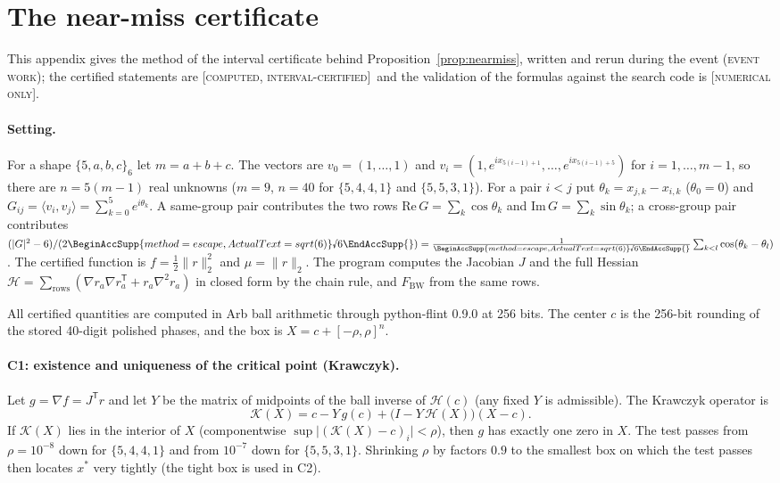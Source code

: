 \documentclass[11pt]{article}
\newcommand{\rnum}[1]{\BeginAccSupp{method=escape,ActualText=sqrt(#1)}\text{\textsurd}#1\EndAccSupp{}}
\newcommand{\rsix}{\rnum{6}}
\newcommand{\ip}[2]{\langle #1,#2\rangle}
\newcommand{\abs}[1]{\lvert #1\rvert}
\newcommand{\norm}[1]{\lVert #1\rVert}
\newcommand{\st}[1]{\textsc{[#1]}}
\newcommand{\stcert}{\st{computed, interval-certified}}
\newcommand{\stnum}{\st{numerical only}}
\newcommand{\event}{\textsc{(event work)}}
\theoremstyle{definition}
\theoremstyle{remark}
\begin{document}
\section{The near-miss certificate}\label{app:nearmiss}

\noindent This appendix gives the method of the interval certificate behind Proposition~\ref{prop:nearmiss}, written and rerun during the event \event; the certified statements are \stcert\ and the validation of the formulas against the search code is \stnum.

\paragraph{Setting.} For a shape $\{5,a,b,c\}_6$ let $m=a+b+c$. The vectors are $v_0=(1,\dots,1)$ and $v_i=(1,e^{ix_{5(i-1)+1}},\dots,e^{ix_{5(i-1)+5}})$ for $i=1,\dots,m-1$, so there are $n=5(m-1)$ real unknowns ($m=9$, $n=40$ for $\{5,4,4,1\}$ and $\{5,5,3,1\}$). For a pair $i<j$ put $\theta_k=x_{j,k}-x_{i,k}$ ($\theta_0=0$) and $G_{ij}=\ip{v_i}{v_j}=\sum_{k=0}^5e^{i\theta_k}$. A same-group pair contributes the two rows $\mathrm{Re}\,G=\sum_k\cos\theta_k$ and $\mathrm{Im}\,G=\sum_k\sin\theta_k$; a cross-group pair contributes $(\abs{G}^2-6)/(2\rsix)=\frac1{\rsix}\sum_{k<l}\cos(\theta_k-\theta_l)$. The certified function is $f=\frac12\norm{r}_2^2$ and $\mu=\norm{r}_2$. The program computes the Jacobian $J$ and the full Hessian $\mathcal H=\sum_{\text{rows}}(\nabla r_a\nabla r_a^{\mathsf T}+r_a\nabla^2r_a)$ in closed form by the chain rule, and $F_{\mathrm{BW}}$ from the same rows.

All certified quantities are computed in Arb ball arithmetic through python-flint 0.9.0 at 256 bits. The center $c$ is the 256-bit rounding of the stored 40-digit polished phases, and the box is $X=c+[-\rho,\rho]^{n}$.

\paragraph{C1: existence and uniqueness of the critical point (Krawczyk).} Let $g=\nabla f=J^{\mathsf T}r$ and let $Y$ be the matrix of midpoints of the ball inverse of $\mathcal H(c)$ (any fixed $Y$ is admissible). The Krawczyk operator is
\[\mathcal K(X)=c-Y\,g(c)+\bigl(I-Y\,\mathcal H(X)\bigr)(X-c).\]
If $\mathcal K(X)$ lies in the interior of $X$ (componentwise $\sup\abs{(\mathcal K(X)-c)_i}<\rho$), then $g$ has exactly one zero in $X$. The test passes from $\rho=10^{-8}$ down for $\{5,4,4,1\}$ and from $10^{-7}$ down for $\{5,5,3,1\}$. Shrinking $\rho$ by factors $0.9$ to the smallest box on which the test passes then locates $x^\ast$ very tightly (the tight box is used in C2).
\end{document}
